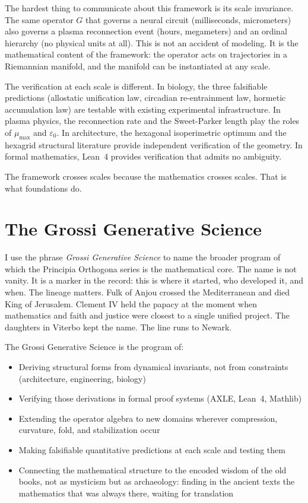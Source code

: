 The hardest thing to communicate about this framework is its
scale invariance. The same operator $G$ that governs a neural
circuit (milliseconds, micrometers) also governs a plasma
reconnection event (hours, megameters) and an ordinal hierarchy
(no physical units at all). This is not an accident of modeling.
It is the mathematical content of the framework: the operator
acts on trajectories in a Riemannian manifold, and the manifold
can be instantiated at any scale.

The verification at each scale is different. In biology, the
three falsifiable predictions (allostatic unification law,
circadian re-entrainment law, hormetic accumulation law) are
testable with existing experimental infrastructure. In plasma
physics, the reconnection rate and the Sweet-Parker length
play the roles of $\mu_{\max}$ and $\varepsilon_0$. In
architecture, the hexagonal isoperimetric optimum and the
hexagrid structural literature provide independent verification
of the geometry. In formal mathematics, Lean~4 provides
verification that admits no ambiguity.

The framework crosses scales because the mathematics crosses
scales. That is what foundations do.

\section{The Grossi Generative Science}
\label{sec:ggs}

I use the phrase \textit{Grossi Generative Science} to name
the broader program of which the Principia Orthogona series
is the mathematical core. The name is not vanity. It is a
marker in the record: this is where it started, who developed
it, and when. The lineage matters. Fulk of Anjou crossed the
Mediterranean and died King of Jerusalem. Clement IV held
the papacy at the moment when mathematics and faith and justice
were closest to a single unified project. The daughters in
Viterbo kept the name. The line runs to Newark.

The Grossi Generative Science is the program of:
\begin{itemize}
\item Deriving structural forms from dynamical invariants,
      not from constraints (architecture, engineering, biology)
\item Verifying those derivations in formal proof systems
      (AXLE, Lean~4, Mathlib)
\item Extending the operator algebra to new domains wherever
      compression, curvature, fold, and stabilization occur
\item Making falsifiable quantitative predictions at each
      scale and testing them
\item Connecting the mathematical structure to the encoded
      wisdom of the old books, not as mysticism but as
      archaeology: finding in the ancient texts the mathematics
      that was always there, waiting for translation
\end{itemize}

